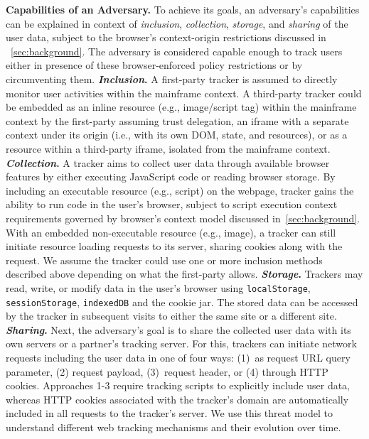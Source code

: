 \noindent \textbf{Capabilities of an Adversary.} 
%
%
To achieve its goals, an adversary's capabilities can be explained in context of \textit{inclusion}, \textit{collection}, \textit{storage}, and \textit{sharing} of the user data, subject to the browser's context-origin restrictions discussed in ~\autoref{sec:background}.
%
The adversary is considered capable enough to track users either in presence of these browser-enforced policy restrictions or by circumventing them.
%
\textbf{\textit{Inclusion}.} 
%
A first-party tracker is assumed to directly monitor user activities within the mainframe context.
%
A third-party tracker could be embedded as an inline resource (e.g., image/script tag) within the mainframe context by the first-party assuming trust delegation, an iframe with a separate context under its origin (i.e., with its own DOM, state, and resources), or as a resource within a third-party iframe, isolated from the mainframe context. 
%
\textbf{\textit{Collection}.}
%
A tracker aims to collect user data through available browser features by either executing JavaScript code or reading browser storage.
%
By including an executable resource (e.g., script) on the webpage, tracker gains the ability to run code in the user’s browser, subject to script execution context requirements governed by browser's context model discussed in~\autoref{sec:background}.
%
With an embedded non-executable resource (e.g., image), a tracker can still initiate resource loading requests to its server, sharing cookies along with the request.
%
We assume the tracker could use one or more inclusion methods described above depending on what the first-party allows.
%
\textbf{\textit{Storage}.}
%
Trackers may read, write, or modify data in the user's browser using \texttt{localStorage}, \texttt{sessionStorage}, \texttt{indexedDB} and the cookie jar.
%
The stored data can be accessed by the tracker in subsequent visits to either the same site or a different site.
%
\textbf{\textit{Sharing}.}
%
Next, the adversary's goal is to share the collected user data with its own servers or a partner's tracking server.
%
For this, trackers can initiate network requests including the user data in one of four ways: (1)~as request URL query parameter, (2) request payload, (3)~request header, or (4) through HTTP cookies.
%
Approaches 1-3 require tracking scripts to explicitly include user data, whereas HTTP cookies associated with the tracker's domain are automatically included in all requests to the tracker's server. %
%
We use this threat model to understand different web tracking mechanisms and their evolution over time.